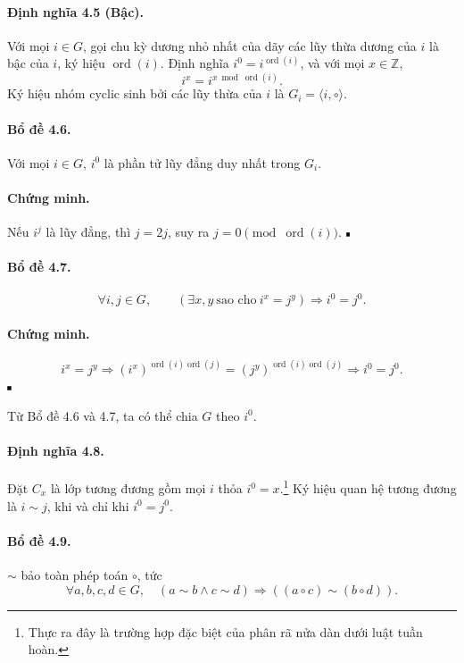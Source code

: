 \documentclass[11pt]{article}
\newcommand{\qedmark}{\hfill\rule{0.7ex}{0.7ex}}
\begin{document}
\paragraph{Định nghĩa 4.5 (Bậc).}
Với mọi \(i\in G\), gọi chu kỳ dương nhỏ nhất của dãy các lũy thừa dương của
\(i\) là bậc của \(i\), ký hiệu \(\operatorname{ord}(i)\). Định nghĩa
\(i^0=i^{\operatorname{ord}(i)}\), và với mọi \(x\in\mathbb Z\),
\[
  i^x=i^{x\bmod\operatorname{ord}(i)}.
\]
Ký hiệu nhóm cyclic sinh bởi các lũy thừa của \(i\) là \(G_i=\langle i,\circ\rangle\).

\paragraph{Bổ đề 4.6.}
Với mọi \(i\in G\), \(i^0\) là phần tử lũy đẳng duy nhất trong \(G_i\).

\paragraph{Chứng minh.}
Nếu \(i^j\) là lũy đẳng, thì \(j=2j\), suy ra
\(j=0\pmod{\operatorname{ord}(i)}\). \(\qedmark\)

\paragraph{Bổ đề 4.7.}
\[
  \forall i,j\in G,\qquad
  \left(\exists x,y\ \text{sao cho}\ i^x=j^y\right)\Rightarrow i^0=j^0.
\]

\paragraph{Chứng minh.}
\[
  i^x=j^y
  \Rightarrow
  (i^x)^{\operatorname{ord}(i)\operatorname{ord}(j)}
  =
  (j^y)^{\operatorname{ord}(i)\operatorname{ord}(j)}
  \Rightarrow i^0=j^0.
\]
\(\qedmark\)

Từ Bổ đề 4.6 và 4.7, ta có thể chia \(G\) theo \(i^0\).

\paragraph{Định nghĩa 4.8.}
Đặt \(C_x\) là lớp tương đương gồm mọi \(i\) thỏa \(i^0=x\).\footnote{Thực ra
đây là trường hợp đặc biệt của phân rã nửa dàn dưới luật tuần hoàn.} Ký hiệu
quan hệ tương đương là \(i\sim j\), khi và chỉ khi \(i^0=j^0\).

\paragraph{Bổ đề 4.9.}
\(\sim\) bảo toàn phép toán \(\circ\), tức
\[
  \forall a,b,c,d\in G,\quad
  (a\sim b\land c\sim d)\Rightarrow ((a\circ c)\sim(b\circ d)).
\]
\end{document}
